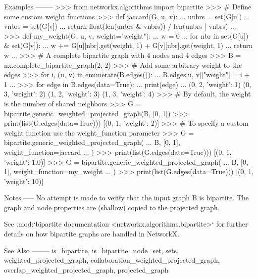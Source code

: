 \begin{DoxyVerb}
Examples
--------
>>> from networkx.algorithms import bipartite
>>> # Define some custom weight functions
>>> def jaccard(G, u, v):
...     unbrs = set(G[u])
...     vnbrs = set(G[v])
...     return float(len(unbrs & vnbrs)) / len(unbrs | vnbrs)
...
>>> def my_weight(G, u, v, weight="weight"):
...     w = 0
...     for nbr in set(G[u]) & set(G[v]):
...         w += G[u][nbr].get(weight, 1) + G[v][nbr].get(weight, 1)
...     return w
...
>>> # A complete bipartite graph with 4 nodes and 4 edges
>>> B = nx.complete_bipartite_graph(2, 2)
>>> # Add some arbitrary weight to the edges
>>> for i, (u, v) in enumerate(B.edges()):
...     B.edges[u, v]["weight"] = i + 1
...
>>> for edge in B.edges(data=True):
...     print(edge)
...
(0, 2, {'weight': 1})
(0, 3, {'weight': 2})
(1, 2, {'weight': 3})
(1, 3, {'weight': 4})
>>> # By default, the weight is the number of shared neighbors
>>> G = bipartite.generic_weighted_projected_graph(B, [0, 1])
>>> print(list(G.edges(data=True)))
[(0, 1, {'weight': 2})]
>>> # To specify a custom weight function use the weight_function parameter
>>> G = bipartite.generic_weighted_projected_graph(
...     B, [0, 1], weight_function=jaccard
... )
>>> print(list(G.edges(data=True)))
[(0, 1, {'weight': 1.0})]
>>> G = bipartite.generic_weighted_projected_graph(
...     B, [0, 1], weight_function=my_weight
... )
>>> print(list(G.edges(data=True)))
[(0, 1, {'weight': 10})]

Notes
-----
No attempt is made to verify that the input graph B is bipartite.
The graph and node properties are (shallow) copied to the projected graph.

See :mod:`bipartite documentation <networkx.algorithms.bipartite>`
for further details on how bipartite graphs are handled in NetworkX.

See Also
--------
is_bipartite,
is_bipartite_node_set,
sets,
weighted_projected_graph,
collaboration_weighted_projected_graph,
overlap_weighted_projected_graph,
projected_graph\end{DoxyVerb}
 \mbox{\label{namespacenetworkx_1_1algorithms_1_1bipartite_1_1projection_a721a560d62d5e95a8d7409975e2c964a}} 
